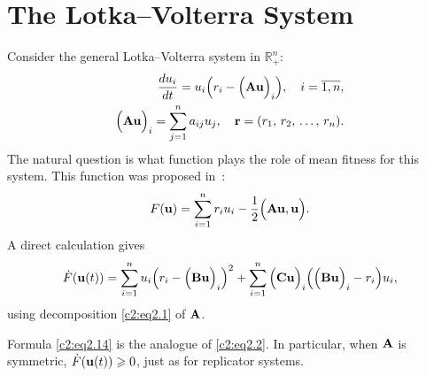 \documentclass[12pt]{report}
\newcommand{\R}{\mathbb{R}}
\theoremstyle{definition}
\theoremstyle{remark}
\begin{document}
\clearpage

\section{The Lotka--Volterra System}\label{c2:section:2.5}
Consider the general Lotka--Volterra system in $\R_{+}^{n}$:
\begin{align}
	\frac{du_{i}}{dt} = u_{i}\Big(r_{i} - \Big({\bf Au}\Big)_{i}\Big), \quad i = \overline{1, n}, \\
    \Big({\bf Au}\Big)_{i} = \sum\limits_{j = 1}^{n}a_{ij}u_{j}, \quad {\bf r} = (r_{1},\, r_{2},\, \ldots,\, r_{n}).
	\label{c2:eq2.13}
\end{align}
The natural question is what function plays the role of mean fitness for this system. This function was proposed in~\cite{c2:Svirezhev1978}:
$$
F({\bf u}) = \sum\limits_{i = 1}^{n}r_{i}u_{i} - \frac{1}{2}\Big({\bf Au, u}\Big).
$$
A direct calculation gives
\begin{equation}
	\dot{F}({\bf u}(t)) = \sum\limits_{i = 1}^{n}u_{i}\Big(r_{i} - \Big({\bf Bu}\Big)_{i}\Big)^{2} + \sum\limits_{i = 1}^{n}\Big({\bf Cu}\Big)_{i}\Big(\Big({\bf Bu}\Big)_{i} - r_{i}\Big)u_{i},
	\label{c2:eq2.14}
\end{equation}
using decomposition \eqref{c2:eq2.1} of ${\bf A}$.

Formula \eqref{c2:eq2.14} is the analogue of \eqref{c2:eq2.2}. In particular, when ${\bf A}$ is symmetric, $\dot{F}({\bf u}(t)) \geqslant 0$, just as for replicator systems.
\end{document}
